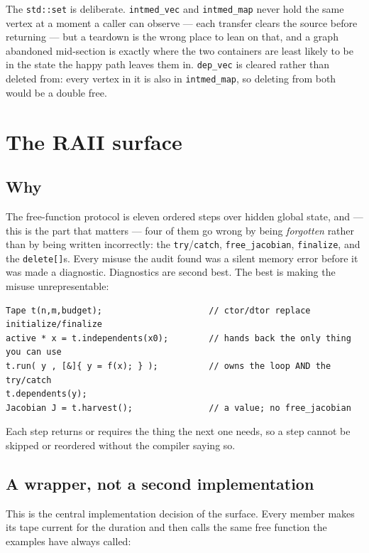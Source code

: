 \documentclass[11pt,a4paper]{report}
\newcommand{\code}[1]{\texttt{#1}}
\begin{document}
The \code{std::set} is deliberate. \code{intmed\_vec} and \code{intmed\_map}
never hold the same vertex at a moment a caller can observe --- each transfer
clears the source before returning --- but a teardown is the wrong place to lean
on that, and a graph abandoned mid-section is exactly where the two containers
are least likely to be in the state the happy path leaves them in.
\code{dep\_vec} is cleared rather than deleted from: every vertex in it is also
in \code{intmed\_map}, so deleting from both would be a double free.

\chapter{The RAII surface}
\label{ch:raii}

\section{Why}

The free-function protocol is eleven ordered steps over hidden global state, and
--- this is the part that matters --- four of them go wrong by being
\emph{forgotten} rather than by being written incorrectly: the
\code{try}/\code{catch}, \code{free\_jacobian}, \code{finalize}, and the
\code{delete[]}s. Every misuse the audit found was a silent memory error before
it was made a diagnostic. Diagnostics are second best. The best is making the
misuse unrepresentable:

\begin{lstlisting}
Tape t(n,m,budget);                     // ctor/dtor replace initialize/finalize
active * x = t.independents(x0);        // hands back the only thing you can use
t.run( y , [&]{ y = f(x); } );          // owns the loop AND the try/catch
t.dependents(y);
Jacobian J = t.harvest();               // a value; no free_jacobian
\end{lstlisting}

Each step returns or requires the thing the next one needs, so a step cannot be
skipped or reordered without the compiler saying so.

\section{A wrapper, not a second implementation}

This is the central implementation decision of the surface. Every member makes
its tape current for the duration and then calls the same free function the
examples have always called:
\end{document}
